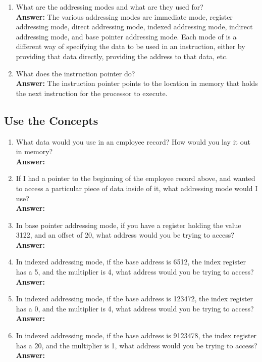 \documentclass[12pt]{article}
\begin{document}
\begin{enumerate}
    \item What are the addressing modes and what are they used for? \\
        \textbf{Answer:} The various addressing modes are immediate mode, register addressing mode, direct addressing mode, indexed addressing mode, indirect addressing mode, and base pointer addressing mode. Each mode of is a different way of specifying the data to be used in an instruction, either by providing that data directly, providing the address to that data, etc.
    \item What does the instruction pointer do? \\
        \textbf{Answer:} The instruction pointer points to the location in memory that holds the next instruction for the processor to execute.
\end{enumerate}

\subsection*{Use the Concepts}
\begin{enumerate}
    \item What data would you use in an employee record? How would you lay it out in memory? \\
        \textbf{Answer:}
    \item If I had a pointer to the beginning of the employee record above, and wanted to access a particular piece of data inside of it, what addressing mode would I use? \\
        \textbf{Answer:}
    \item In base pointer addressing mode, if you have a register holding the value 3122, and an offset of 20, what address would you be trying to access? \\
        \textbf{Answer:}
    \item In indexed addressing mode, if the base address is 6512, the index register has a 5, and the multiplier is 4, what address would you be trying to access? \\
        \textbf{Answer:}
    \item In indexed addressing mode, if the base address is 123472, the index register has a 0, and the multiplier is 4, what address would you be trying to access? \\
        \textbf{Answer:}
    \item In indexed addressing mode, if the base address is 9123478, the index register has a 20, and the multiplier is 1, what address would you be trying to access? \\
        \textbf{Answer:}
\end{enumerate}
\end{document}
